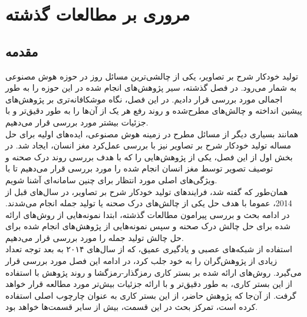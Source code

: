 \chapter{مروری بر مطالعات گذشته}

\section{مقدمه}
تولید خودکار شرح بر تصاویر، یکی از چالشی‌ترین مسائل روز در حوزه هوش مصنوعی به شمار می‌رود. در فصل گذشته، سیر پژوهش‌های انجام شده در این حوزه را به طور اجمالی مورد بررسی قرار دادیم. در این فصل، نگاه موشکافانه‌تری بر پژوهش‌های پیشین انداخته و چالش‌های مطرح‌شده و روند رفع هر یک از آن‌ها را به طور دقیق‌تر و با جزئیات بیشتر مورد بررسی قرار می‌دهیم.
\\
همانند بسیاری دیگر از مسائل مطرح در زمینه‌ هوش مصنوعی، ایده‌های اولیه برای حل مساله تولید خودکار شرح بر تصاویر نیز با بررسی عمل‌کرد مغز انسان، ایجاد شد. در بخش اول از این فصل، یکی از پژوهش‌هایی را که با هدف بررسی روند درک صحنه و توصیف تصویر توسط مغز انسان انجام شده را مورد بررسی قرار می‌دهیم تا با ویژگی‌های اصلی مورد انتظار برای چنین سامانه‌ای آشنا شویم.
\\
همان‌طور که گفته شد، فرایندهای تولید خودکار شرح بر تصاویر، در سال‌های قبل از 2014، عموما با هدف حل یکی از چالش‌های درک صحنه یا تولید جمله انجام می‌شدند. در ادامه بحث و بررسی پیرامون مطالعات گذشته، ابتدا نمونه‌هایی از روش‌های ارائه شده برای حل چالش درک صحنه و سپس نمونه‌هایی از پژوهش‌های انجام شده برای حل چالش تولید جمله را مورد بررسی قرار می‌دهیم.
\\
استفاده از شبکه‌های عصبی و یادگیری عمیق، که از سال‌های ۲۰۱۴ به بعد توجه تعداد زیادی از پژوهش‌گران را به خود جلب کرد، در ادامه این فصل مورد بررسی قرار می‌گیرد. روش‌های ارائه شده بر بستر کاری رمزگذار-رمزگشا و روند پژوهش با استفاده از این بستر کاری، به طور دقیق‌تر و با ارائه جزئیات بیش‌تر مورد مطالعه قرار خواهد گرفت. از آن‌جا که پژوهش حاضر، از این بستر کاری به عنوان چارچوب اصلی استفاده کرده است، تمرکز بحث در این قسمت، بیش از سایر قسمت‌ها خواهد بود.

